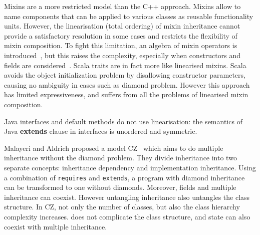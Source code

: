 Mixins are a more restricted model than the C++ approach. Mixins allow to name
components that can be applied to various classes as reusable functionality
units. However, %
the linearisation (total ordering) of
mixin inheritance cannot provide a satisfactory resolution in some cases and
restricts the flexibility of mixin composition. To fight this limitation, an
algebra of mixin operators is introduced~\cite{ancona2002calculus}, but this
raises the complexity, especially when constructors and fields
are considered~\cite{marco09FJigsaw}. Scala traits are in fact more like linearised mixins.
Scala avoids the object initialization
problem by disallowing constructor parameters, causing no ambiguity in cases
such as diamond problem. However this approach has limited expressiveness, and
suffers from all the problems of linearised mixin composition. %
\begin{comment}
Python also offers multiple inheritance via linearised mixins. Indeed in python any class is implicitly a mixin, and mixin composition informally expressed as\\*
\Q@ class A use B,C {...new methods...}@\\*
can be expressed in python as \\*
\Q@ class Aux: ...new methods...@\\*
\Q@ class A(B,C,Aux): pass@
\end{comment}
\noindent Java interfaces and default methods do not use
linearisation: the semantics of Java \textbf{extends} clause in
interfaces is unordered and symmetric.


Malayeri and Aldrich proposed a model CZ~\cite{malayeri2009cz} which
aims to do multiple inheritance without the diamond problem. They
divide inheritance into two separate concepts: inheritance dependency
and implementation inheritance. Using a combination of
\texttt{requires} and \texttt{extends}, a program with diamond
inheritance can be transformed to one without diamonds. Moreover,
fields and multiple inheritance can coexist. However untangling
inheritance also untangles the class structure. In CZ, not only the
number of classes, but also the class hierarchy complexity
increases. \mixin does not complicate the class structure, and state
can also coexist with multiple inheritance.

